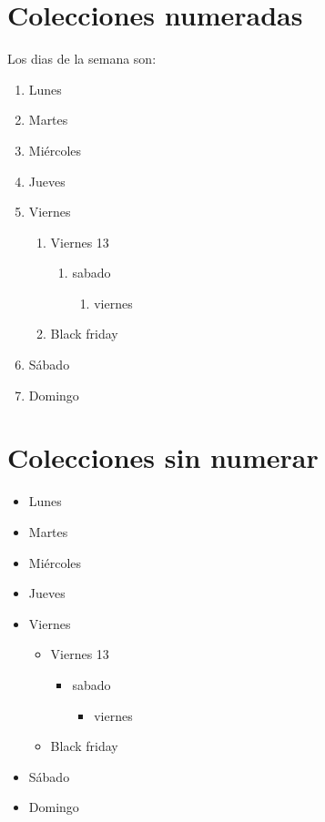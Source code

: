 \documentclass[10pt,a4paper]{article}
\author{Gustavo}
\begin{document}
\section{Colecciones numeradas}
Los dias de la semana son:
	\begin{enumerate}
		\item Lunes
		\item Martes
		\item Miércoles
		\item Jueves
		\item Viernes
			\begin{enumerate}
				\item Viernes 13
					\begin{enumerate}
						\item sabado
							\begin{enumerate}
								\item viernes		
							\end{enumerate}
					\end{enumerate}
				\item Black friday
			\end{enumerate}
		\item Sábado
		\item Domingo
	\end{enumerate}
\section{Colecciones sin numerar}
\begin{itemize}

		\item Lunes
		\item Martes
		\item Miércoles
		\item Jueves
		\item Viernes
			\begin{itemize}
				\item Viernes 13
					\begin{itemize}
						\item sabado
							\begin{itemize}
								\item viernes		
							\end{itemize}
					\end{itemize}
				\item Black friday
			\end{itemize}
		\item Sábado
		\item Domingo
	\end{itemize}
\end{document}
